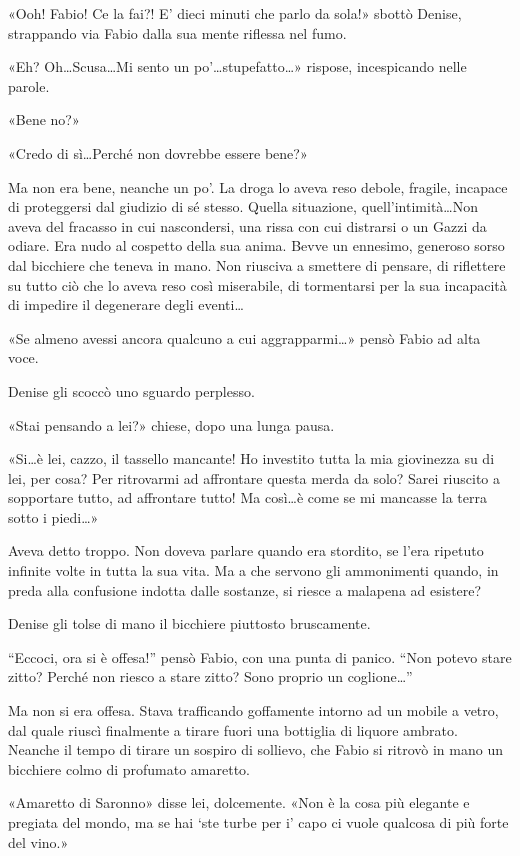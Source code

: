 «Ooh! Fabio! Ce la fai?! E' dieci minuti che parlo da sola!» sbottò Denise, strappando via Fabio dalla sua mente riflessa nel fumo.

«Eh? Oh\ldots Scusa\ldots Mi sento un po'\ldots stupefatto\ldots» rispose, incespicando nelle parole.

«Bene no?»

«Credo di sì\ldots Perché non dovrebbe essere bene?»

Ma non era bene, neanche un po'. La droga lo aveva reso debole, fragile, incapace di proteggersi dal giudizio di sé stesso. Quella situazione, quell'intimità\ldots Non aveva del fracasso in cui nascondersi, una rissa con cui distrarsi o un Gazzi da odiare. Era nudo al cospetto della sua anima. Bevve un ennesimo, generoso sorso dal bicchiere che teneva in mano. Non riusciva a smettere di pensare, di riflettere su tutto ciò che lo aveva reso così miserabile, di tormentarsi per la sua incapacità di impedire il degenerare degli eventi\ldots

«Se almeno avessi ancora qualcuno a cui aggrapparmi\ldots» pensò Fabio ad alta voce.

Denise gli scoccò uno sguardo perplesso.

«Stai pensando a lei?» chiese, dopo una lunga pausa.

«Si\ldots è lei, cazzo, il tassello mancante! Ho investito tutta la mia giovinezza su di lei, per cosa? Per ritrovarmi ad affrontare questa merda da solo? Sarei riuscito a sopportare tutto, ad affrontare tutto! Ma così\ldots è come se mi mancasse la terra sotto i piedi\ldots»

Aveva detto troppo. Non doveva parlare quando era stordito, se l'era ripetuto infinite volte in tutta la sua vita. Ma a che servono gli ammonimenti quando, in preda alla confusione indotta dalle sostanze, si riesce a malapena ad esistere?

Denise gli tolse di mano il bicchiere piuttosto bruscamente.

``Eccoci, ora si è offesa!'' pensò Fabio, con una punta di panico. ``Non potevo stare zitto? Perché non riesco a stare zitto? Sono proprio un coglione\ldots''

Ma non si era offesa. Stava trafficando goffamente intorno ad un mobile a vetro, dal quale riuscì finalmente a tirare fuori una bottiglia di liquore ambrato. Neanche il tempo di tirare un sospiro di sollievo, che Fabio si ritrovò in mano un bicchiere colmo di profumato amaretto.

«Amaretto di Saronno» disse lei, dolcemente. «Non è la cosa più elegante e pregiata del mondo, ma se hai `ste turbe per i' capo ci vuole qualcosa di più forte del vino.»

